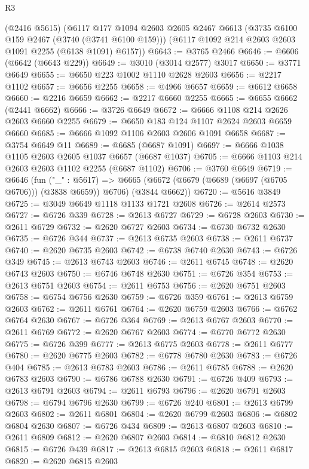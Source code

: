 \begin{lexlean}{R3}
\begin{coremodule}
    (@2416 @5615)
    (@6117
      @177
      @1094
      @2603
      @2605
      @2467
      @6613
      (@3735 @6100 @159 @2467 (@3740 (@3741 @6100 @159)))
      (@6117 @1092 @214 @2603 @2603 @1091 @2255 (@6138 @1091) @6157))
@6643 := @3765 @2466
@6646 := @6606 (@6642 (@6643 @229))
@6649 := @3010 (@3014 @2577) @3017
@6650 := @3771 @6649
@6655 := @6650 @223 @1002 @1110 @2628 @2603
@6656 := @2217 @1102
@6657 := @6656 @2255
@6658 := @4966 @6657
@6659 := @6612 @6658
@6660 := @2216 @6659
@6662 := @2217 @6660 @2255
@6665 := @6655 @6662 (@2441 @6662)
@6666 := @3726 @6649
@6672 := @6666 @1108 @214 @2626 @2603 @6660 @2255
@6679 := @6650 @183 @124 @1107 @2624 @2603 @6659 @6660
@6685 := @6666 @1092 @1106 @2603 @2606 @1091 @6658
@6687 := @3754 @6649 @11
@6689 := @6685 (@6687 @1091)
@6697 := @6666 @1038 @1105 @2603 @2605 @1037 @6657 (@6687 @1037)
@6705 := @6666 @1103 @214 @2603 @2603 @1102 @2255 (@6687 @1102)
@6706 := @3760 @6649
@6719 := @6646
    (fun ("_" : @5617) =>
    @6665 (@6672 (@6679 (@6689 (@6697 (@6705 @6706))) (@3838 @6659)) @6706) (@3844 @6662))
@6720 := @5616 @3849
@6725 := @3049 @6649 @1118 @1133 @1721 @2608
@6726 := @2614 @2573
@6727 := @6726 @339
@6728 := @2613 @6727
@6729 := @6728 @2603
@6730 := @2611 @6729
@6732 := @2620 @6727 @2603
@6734 := @6730 @6732 @2630
@6735 := @6726 @344
@6737 := @2613 @6735 @2603
@6738 := @2611 @6737
@6740 := @2620 @6735 @2603
@6742 := @6738 @6740 @2630
@6743 := @6726 @349
@6745 := @2613 @6743 @2603
@6746 := @2611 @6745
@6748 := @2620 @6743 @2603
@6750 := @6746 @6748 @2630
@6751 := @6726 @354
@6753 := @2613 @6751 @2603
@6754 := @2611 @6753
@6756 := @2620 @6751 @2603
@6758 := @6754 @6756 @2630
@6759 := @6726 @359
@6761 := @2613 @6759 @2603
@6762 := @2611 @6761
@6764 := @2620 @6759 @2603
@6766 := @6762 @6764 @2630
@6767 := @6726 @364
@6769 := @2613 @6767 @2603
@6770 := @2611 @6769
@6772 := @2620 @6767 @2603
@6774 := @6770 @6772 @2630
@6775 := @6726 @399
@6777 := @2613 @6775 @2603
@6778 := @2611 @6777
@6780 := @2620 @6775 @2603
@6782 := @6778 @6780 @2630
@6783 := @6726 @404
@6785 := @2613 @6783 @2603
@6786 := @2611 @6785
@6788 := @2620 @6783 @2603
@6790 := @6786 @6788 @2630
@6791 := @6726 @409
@6793 := @2613 @6791 @2603
@6794 := @2611 @6793
@6796 := @2620 @6791 @2603
@6798 := @6794 @6796 @2630
@6799 := @6726 @240
@6801 := @2613 @6799 @2603
@6802 := @2611 @6801
@6804 := @2620 @6799 @2603
@6806 := @6802 @6804 @2630
@6807 := @6726 @434
@6809 := @2613 @6807 @2603
@6810 := @2611 @6809
@6812 := @2620 @6807 @2603
@6814 := @6810 @6812 @2630
@6815 := @6726 @439
@6817 := @2613 @6815 @2603
@6818 := @2611 @6817
@6820 := @2620 @6815 @2603

\end{coremodule}
\end{lexlean}
